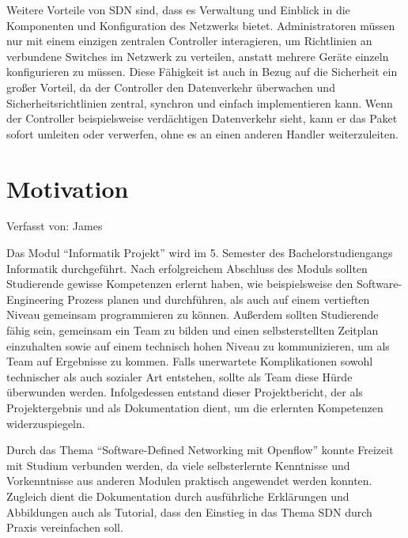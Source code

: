 \documentclass[fontsize=12pt,paper=a4,open=any,parskip=half,
  twoside=false,toc=listof,toc=bibliography,fleqn,leqno,
  captions=nooneline,captions=tableabove,british]{scrbook}
\begin{document}
Weitere Vorteile von SDN sind, dass es Verwaltung und Einblick in die Komponenten und Konfiguration des Netzwerks bietet. Administratoren müssen nur mit einem einzigen zentralen Controller interagieren, um Richtlinien an verbundene Switches im Netzwerk zu verteilen, anstatt mehrere Geräte einzeln konfigurieren zu müssen. Diese Fähigkeit ist auch in Bezug auf die Sicherheit ein großer Vorteil, da der Controller den Datenverkehr überwachen und Sicherheitsrichtlinien zentral, synchron und einfach implementieren kann. Wenn der Controller beispielsweise verdächtigen Datenverkehr sieht, kann er das Paket sofort umleiten oder verwerfen, ohne es an einen anderen Handler weiterzuleiten.\cite{sdnbenefitstung}


\newpage
\section{Motivation}
{\tiny Verfasst von: James\par}
Das Modul “Informatik Projekt” wird im 5. Semester des Bachelorstudiengangs Informatik durchgeführt. Nach erfolgreichem Abschluss des Moduls sollten Studierende gewisse Kompetenzen erlernt haben, wie beispielsweise den Software-Engineering Prozess planen und durchführen, als auch auf einem vertieften Niveau gemeinsam programmieren zu können. Außerdem sollten Studierende fähig sein, gemeinsam ein Team zu bilden und einen selbsterstellten Zeitplan einzuhalten sowie auf einem technisch hohen Niveau zu kommunizieren, um als Team auf Ergebnisse zu kommen. Falls unerwartete Komplikationen sowohl technischer als auch sozialer Art entstehen, sollte als Team diese Hürde überwunden werden. Infolgedessen entstand dieser Projektbericht, der als Projektergebnis und als Dokumentation dient, um die erlernten Kompetenzen widerzuspiegeln.\par
Durch das Thema “Software-Defined Networking mit Openflow” konnte Freizeit mit Studium verbunden werden, da viele selbsterlernte Kenntnisse und Vorkenntnisse aus anderen Modulen praktisch angewendet werden konnten. Zugleich dient die Dokumentation durch ausführliche Erklärungen und Abbildungen auch als Tutorial, dass den Einstieg in das Thema SDN durch Praxis vereinfachen soll.
\end{document}
